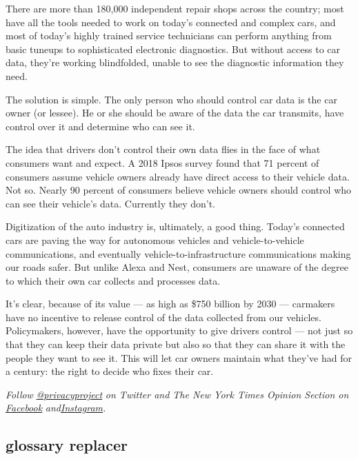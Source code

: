 There are more than 180,000 independent repair shops across the country;
most have all the tools needed to work on today's connected and complex
cars, and most of today's highly trained service technicians can perform
anything from basic tuneups to sophisticated electronic diagnostics. But
without access to car data, they're working blindfolded, unable to see
the diagnostic information they need.

The solution is simple. The only person who should control car data is
the car owner (or lessee). He or she should be aware of the data the car
transmits, have control over it and determine who can see it.

The idea that drivers don't control their own data flies in the face of
what consumers want and expect. A 2018 Ipsos survey found that 71
percent of consumers assume vehicle owners already have direct access to
their vehicle data. Not so. Nearly 90 percent of consumers believe
vehicle owners should control who can see their vehicle's data.
Currently they don't.

Digitization of the auto industry is, ultimately, a good thing. Today's
connected cars are paving the way for autonomous vehicles and
vehicle-to-vehicle communications, and eventually
vehicle-to-infrastructure communications making our roads safer. But
unlike Alexa and Nest, consumers are unaware of the degree to which
their own car collects and processes data.

It's clear, because of its value --- as high as \$750 billion by 2030
--- carmakers have no incentive to release control of the data collected
from our vehicles. Policymakers, however, have the opportunity to give
drivers control --- not just so that they can keep their data private
but also so that they can share it with the people they want to see it.
This will let car owners maintain what they've had for a century: the
right to decide who fixes their car.

\emph{Follow}
\href{https://twitter.com/privacyproject}{\emph{@privacyproject}}
\emph{on Twitter and The New York Times Opinion Section on}
\href{https://www.facebook.com/nytopinion}{\emph{Facebook}}
\emph{and}\href{https://www.instagram.com/nytopinion/}{\emph{Instagram}}\emph{.}

\hypertarget{glossary-replacer}{%
\subsection{glossary replacer}\label{glossary-replacer}}


